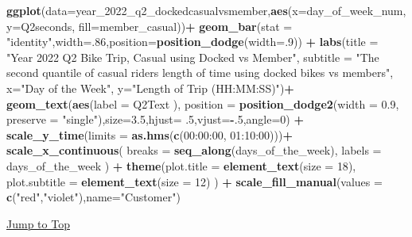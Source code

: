 \documentclass[
]{article}
\newenvironment{Shaded}{\begin{snugshade}}{\end{snugshade}}
\newcommand{\AttributeTok}[1]{\textcolor[rgb]{0.13,0.29,0.53}{#1}}
\newcommand{\DecValTok}[1]{\textcolor[rgb]{0.00,0.00,0.81}{#1}}
\newcommand{\FloatTok}[1]{\textcolor[rgb]{0.00,0.00,0.81}{#1}}
\newcommand{\FunctionTok}[1]{\textcolor[rgb]{0.13,0.29,0.53}{\textbf{#1}}}
\newcommand{\NormalTok}[1]{#1}
\newcommand{\SpecialCharTok}[1]{\textcolor[rgb]{0.81,0.36,0.00}{\textbf{#1}}}
\newcommand{\StringTok}[1]{\textcolor[rgb]{0.31,0.60,0.02}{#1}}
\begin{document}
\begin{Shaded}
\begin{Highlighting}[]
\FunctionTok{ggplot}\NormalTok{(}\AttributeTok{data=}\NormalTok{year\_2022\_q2\_dockedcasualvsmember,}\FunctionTok{aes}\NormalTok{(}\AttributeTok{x=}\NormalTok{day\_of\_week\_num,}\AttributeTok{y=}\NormalTok{Q2seconds, }\AttributeTok{fill=}\NormalTok{member\_casual))}\SpecialCharTok{+}
  \FunctionTok{geom\_bar}\NormalTok{(}\AttributeTok{stat =} \StringTok{"identity"}\NormalTok{,}\AttributeTok{width=}\NormalTok{.}\DecValTok{86}\NormalTok{,}\AttributeTok{position=}\FunctionTok{position\_dodge}\NormalTok{(}\AttributeTok{width=}\NormalTok{.}\DecValTok{9}\NormalTok{)) }\SpecialCharTok{+}
  \FunctionTok{labs}\NormalTok{(}\AttributeTok{title =} \StringTok{"Year 2022 Q2 Bike Trip, Casual using Docked vs Member"}\NormalTok{,}
       \AttributeTok{subtitle =} \StringTok{"The second quantile of casual rider\textquotesingle{}s length of time using docked bikes vs member\textquotesingle{}s"}\NormalTok{,}
       \AttributeTok{x=}\StringTok{"Day of the Week"}\NormalTok{,}
       \AttributeTok{y=}\StringTok{"Length of Trip (HH:MM:SS)"}\NormalTok{)}\SpecialCharTok{+}
  \FunctionTok{geom\_text}\NormalTok{(}\FunctionTok{aes}\NormalTok{(}\AttributeTok{label =}\NormalTok{ Q2Text ),}
            \AttributeTok{position =} \FunctionTok{position\_dodge2}\NormalTok{(}\AttributeTok{width =} \FloatTok{0.9}\NormalTok{, }\AttributeTok{preserve =} \StringTok{"single"}\NormalTok{),}\AttributeTok{size=}\FloatTok{3.5}\NormalTok{,}\AttributeTok{hjust=}\NormalTok{ .}\DecValTok{5}\NormalTok{,}\AttributeTok{vjust=}\SpecialCharTok{{-}}\NormalTok{.}\DecValTok{5}\NormalTok{,}\AttributeTok{angle=}\DecValTok{0}\NormalTok{) }\SpecialCharTok{+}
  \FunctionTok{scale\_y\_time}\NormalTok{(}\AttributeTok{limits =} \FunctionTok{as.hms}\NormalTok{(}\FunctionTok{c}\NormalTok{(}\StringTok{\textquotesingle{}00:00:00\textquotesingle{}}\NormalTok{, }\StringTok{\textquotesingle{}01:10:00\textquotesingle{}}\NormalTok{)))}\SpecialCharTok{+}
  \FunctionTok{scale\_x\_continuous}\NormalTok{(}
    \AttributeTok{breaks =} \FunctionTok{seq\_along}\NormalTok{(days\_of\_the\_week), }
    \AttributeTok{labels =}\NormalTok{ days\_of\_the\_week}
\NormalTok{  )  }\SpecialCharTok{+}
  \FunctionTok{theme}\NormalTok{(}\AttributeTok{plot.title =} \FunctionTok{element\_text}\NormalTok{(}\AttributeTok{size =} \DecValTok{18}\NormalTok{),}
        \AttributeTok{plot.subtitle =} \FunctionTok{element\_text}\NormalTok{(}\AttributeTok{size =} \DecValTok{12}\NormalTok{)}
\NormalTok{  ) }\SpecialCharTok{+}
  \FunctionTok{scale\_fill\_manual}\NormalTok{(}\AttributeTok{values =} \FunctionTok{c}\NormalTok{(}\StringTok{"red"}\NormalTok{,}\StringTok{"violet"}\NormalTok{),}\AttributeTok{name=}\StringTok{"Customer"}\NormalTok{)}
\end{Highlighting}
\end{Shaded}

\protect\hyperlink{toc}{Jump to Top}
\end{document}

